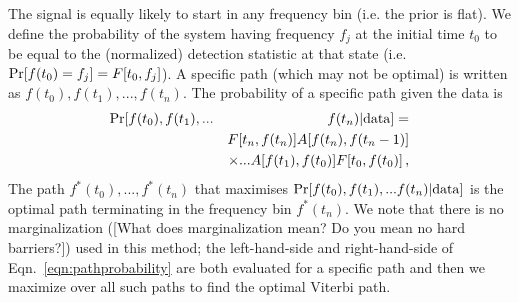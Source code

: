 \documentclass[paper-main.tex]{subfiles}
\begin{document}
The signal is equally likely to start in any frequency bin (i.e. the prior is flat). 
We define the probability of the system having frequency $f_j$ at the initial time $t_0$ to be equal to the (normalized) detection statistic at that state (i.e.\  ${\rm Pr}[f(t_0) = f_j] = F[t_0,f_j]$).
A specific path (which may not be optimal) is written as $f(t_0), f(t_1),..., f(t_n)$. 
The probability of a specific path given the data is 
\begin{eqnarray}
{\rm Pr}[ f(t_0), f(t_1),... && f(t_n) | {\rm data}] = \nonumber\\
          && F[t_n,f(t_n)] A[f(t_n),f(t_n-1)] \nonumber \\
          && \times... A[f(t_1),f(t_0)] F[t_0,f(t_0)] \,,
\label{eqn:pathprobability}
\end{eqnarray}
The path $f^\ast(t_0),...,f^\ast(t_n)$ that maximises ${\rm Pr}[ f(t_0), f(t_1),... f(t_n) | {\rm data}]$ is the optimal path terminating in the frequency bin $f^\ast(t_n)$. 
We note that there is no marginalization \han([What does marginalization mean? Do you mean no hard barriers?]) used in this method; the left-hand-side and right-hand-side of Eqn.~\ref{eqn:pathprobability} are both evaluated for a specific path and then we maximize over all such paths to find the optimal Viterbi path. 
\end{document}
